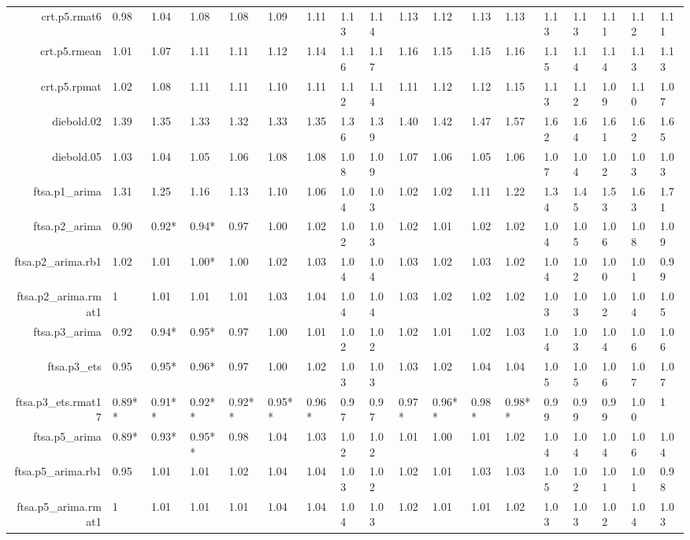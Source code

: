 \begin{table}[ht]
{\begin{tabular}{rlllllllllllllllll}
  crt.p5.rmat6 & 0.98 & 1.04 & 1.08 & 1.08 & 1.09 & 1.11 & 1.13 & 1.14 & 1.13 & 1.12 & 1.13 & 1.13 & 1.13 & 1.13 & 1.11 & 1.12 & 1.11 \\ 
  crt.p5.rmean & 1.01 & 1.07 & 1.11 & 1.11 & 1.12 & 1.14 & 1.16 & 1.17 & 1.16 & 1.15 & 1.15 & 1.16 & 1.15 & 1.14 & 1.14 & 1.13 & 1.13 \\ 
  crt.p5.rpmat & 1.02 & 1.08 & 1.11 & 1.11 & 1.10 & 1.11 & 1.12 & 1.14 & 1.11 & 1.12 & 1.12 & 1.15 & 1.13 & 1.12 & 1.09 & 1.10 & 1.07 \\ 
  diebold.02 & 1.39 & 1.35 & 1.33 & 1.32 & 1.33 & 1.35 & 1.36 & 1.39 & 1.40 & 1.42 & 1.47 & 1.57 & 1.62 & 1.64 & 1.61 & 1.62 & 1.65 \\ 
  diebold.05 & 1.03 & 1.04 & 1.05 & 1.06 & 1.08 & 1.08 & 1.08 & 1.09 & 1.07 & 1.06 & 1.05 & 1.06 & 1.07 & 1.04 & 1.02 & 1.03 & 1.03 \\ 
  ftsa.p1\_arima & 1.31 & 1.25 & 1.16 & 1.13 & 1.10 & 1.06 & 1.04 & 1.03 & 1.02 & 1.02 & 1.11 & 1.22 & 1.34 & 1.45 & 1.53 & 1.63 & 1.71 \\ 
  ftsa.p2\_arima & 0.90 & 0.92* & 0.94* & 0.97 & 1.00 & 1.02 & 1.02 & 1.03 & 1.02 & 1.01 & 1.02 & 1.02 & 1.04 & 1.05 & 1.06 & 1.08 & 1.09 \\ 
  ftsa.p2\_arima.rb1 & 1.02 & 1.01 & 1.00* & 1.00 & 1.02 & 1.03 & 1.04 & 1.04 & 1.03 & 1.02 & 1.03 & 1.02 & 1.04 & 1.02 & 1.00 & 1.01 & 0.99 \\ 
  ftsa.p2\_arima.rmat1 & 1 & 1.01 & 1.01 & 1.01 & 1.03 & 1.04 & 1.04 & 1.04 & 1.03 & 1.02 & 1.02 & 1.02 & 1.03 & 1.03 & 1.02 & 1.04 & 1.05 \\ 
  ftsa.p3\_arima & 0.92 & 0.94* & 0.95* & 0.97 & 1.00 & 1.01 & 1.02 & 1.02 & 1.02 & 1.01 & 1.02 & 1.03 & 1.04 & 1.03 & 1.04 & 1.06 & 1.06 \\ 
  ftsa.p3\_ets & 0.95 & 0.95* & 0.96* & 0.97 & 1.00 & 1.02 & 1.03 & 1.03 & 1.03 & 1.02 & 1.04 & 1.04 & 1.05 & 1.05 & 1.06 & 1.07 & 1.07 \\ 
  ftsa.p3\_ets.rmat17 & 0.89** & 0.91** & 0.92** & 0.92** & 0.95** & 0.96* & 0.97 & 0.97 & 0.97* & 0.96** & 0.98* & 0.98** & 0.99 & 0.99 & 0.99 & 1.00 & 1 \\ 
  ftsa.p5\_arima & 0.89* & 0.93* & 0.95** & 0.98 & 1.04 & 1.03 & 1.02 & 1.02 & 1.01 & 1.00 & 1.01 & 1.02 & 1.04 & 1.04 & 1.04 & 1.06 & 1.04 \\ 
  ftsa.p5\_arima.rb1 & 0.95 & 1.01 & 1.01 & 1.02 & 1.04 & 1.04 & 1.03 & 1.02 & 1.02 & 1.01 & 1.03 & 1.03 & 1.05 & 1.02 & 1.01 & 1.01 & 0.98 \\ 
  ftsa.p5\_arima.rmat1 & 1 & 1.01 & 1.01 & 1.01 & 1.04 & 1.04 & 1.04 & 1.03 & 1.02 & 1.01 & 1.01 & 1.02 & 1.03 & 1.03 & 1.02 & 1.04 & 1.03 \\ 

\end{tabular}}
\end{table}
